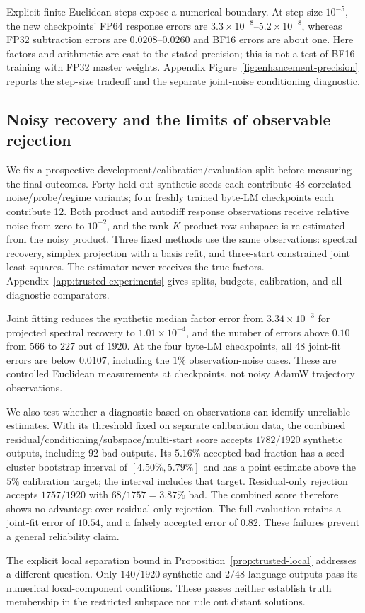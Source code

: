 Explicit finite Euclidean steps expose a numerical boundary. At step size
$10^{-5}$, the new checkpoints' FP64 response errors are
$3.3\times10^{-8}$--$5.2\times10^{-8}$, whereas FP32 subtraction errors are
$0.0208$--$0.0260$ and BF16 errors are about one.
Here factors and arithmetic are cast to the stated precision; this is not a
test of BF16 training with FP32 master weights. Appendix
Figure~\ref{fig:enhancement-precision} reports the step-size tradeoff and the
separate joint-noise conditioning diagnostic.

\subsection{Noisy recovery and the limits of observable rejection}
\label{sec:trusted-recovery}

We fix a prospective development/calibration/evaluation split before
measuring the final outcomes. Forty held-out synthetic seeds each contribute
48 correlated noise/probe/regime variants; four freshly trained byte-LM
checkpoints each contribute 12. Both product and autodiff response
observations receive relative noise from zero to $10^{-2}$, and the rank-$K$
product row subspace is re-estimated from the noisy product.
Three fixed methods use the same observations: spectral recovery,
simplex projection with a basis refit, and three-start constrained joint
least squares. The estimator never receives the true factors.
Appendix~\ref{app:trusted-experiments} gives splits, budgets, calibration,
and all diagnostic comparators.



Joint fitting reduces the synthetic median factor error from
$3.34\times10^{-3}$ for projected spectral recovery to $1.01\times10^{-4}$,
and the number of errors above $0.10$ from $566$ to $227$ out of $1920$.
At the four byte-LM checkpoints, all 48 joint-fit errors are below $0.0107$,
including the $1\%$ observation-noise cases. These are controlled Euclidean
measurements at checkpoints, not noisy AdamW trajectory observations.

We also test whether a diagnostic based on observations can identify
unreliable estimates. With its threshold fixed on separate calibration
data, the combined residual/conditioning/subspace/multi-start score accepts
$1782/1920$ synthetic outputs, including 92 bad outputs. Its $5.16\%$
accepted-bad fraction has a seed-cluster bootstrap interval of
$[4.50\%,5.79\%]$ and has a point estimate above the $5\%$ calibration target;
the interval includes that target.
Residual-only rejection accepts $1757/1920$ with $68/1757=3.87\%$ bad.
The combined score therefore shows no advantage over residual-only rejection.
The full evaluation retains a joint-fit error of $10.54$, and a falsely
accepted error of $0.82$. These failures prevent a general reliability claim.

The explicit local separation bound in
Proposition~\ref{prop:trusted-local} addresses a different question.
Only $140/1920$ synthetic and $2/48$ language outputs pass its numerical
local-component conditions. These passes neither establish truth membership
in the restricted subspace nor rule out distant solutions.
